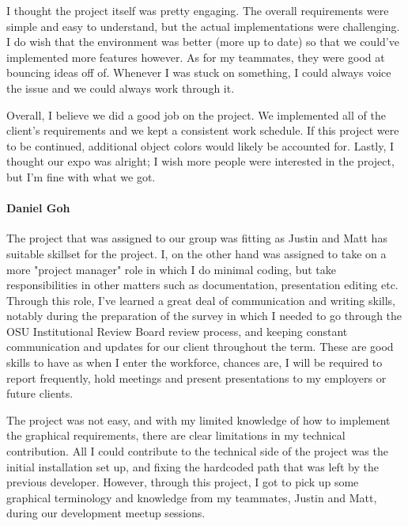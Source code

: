 {I thought the project itself was pretty engaging. 
The overall requirements were simple and easy to understand, but the actual implementations were challenging. 
I do wish that the environment was better (more up to date) so that we could've implemented more features however. 
As for my teammates, they were good at bouncing ideas off of. Whenever I was stuck on something, 
I could always voice the issue and we could always work through it. \\ \par \vspace{3mm}

Overall, I believe we did a good job on the project. 
We implemented all of the client's requirements and we kept a consistent work schedule. 
If this project were to be continued, additional object colors would likely be accounted for. Lastly, 
I thought our expo was alright; I wish more people were interested in the project, but I'm fine with what we got. \\ \par \vspace{3mm}

\vspace{3mm}
\paragraph{Daniel Goh}
The project that was assigned to our group was fitting as Justin and Matt has suitable skillset for the project. 
I, on the other hand was assigned to take on a more "project manager" role in which I do minimal coding, but take responsibilities in other matters such as documentation, presentation editing etc. 
Through this role, I've learned a great deal of communication and writing skills, notably during the preparation of the survey in which I needed to go through the OSU Institutional Review Board review process, and keeping constant communication and updates for our client throughout the term. 
These are good skills to have as when I enter the workforce, chances are, I will be required to report frequently, hold meetings and present presentations to my employers or future clients. \\ \par \vspace{3mm}

The project was not easy, and with my limited knowledge of how to implement the graphical requirements, there are clear limitations in my technical contribution. 
All I could contribute to the technical side of the project was the initial installation set up, and fixing the hardcoded path that was left by the previous developer. 
However, through this project, I got to pick up some graphical terminology and knowledge from my teammates, Justin and Matt, during our development meetup sessions. \\ \par \vspace{3mm}

}
